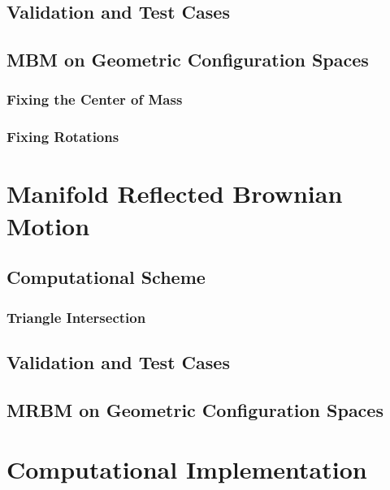 
\subsection{Validation and Test Cases}
\subsection{MBM on Geometric Configuration Spaces}
\subsubsection{Fixing the Center of Mass}
\subsubsection{Fixing Rotations}

\section{Manifold Reflected Brownian Motion}
\subsection{Computational Scheme}
\subsubsection{Triangle Intersection}
\subsection{Validation and Test Cases}
\subsection{MRBM on Geometric Configuration Spaces}

\section{Computational Implementation}
